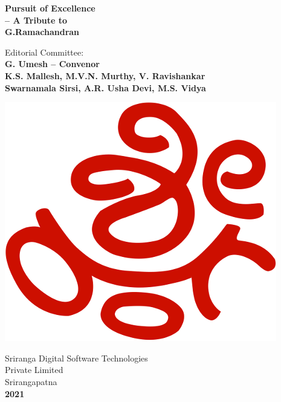 \thispagestyle{empty}
\begin{center}
{\fontsize{20}{22} \selectfont\sf \textbf{Pursuit of Excellence\\ – A Tribute to\\[8pt]  G.Ramachandran}}
\vfill


{\large Editorial Committee:}\\[4pt]
{\fontsize{12}{14}\selectfont\bfseries 
G. Umesh – Convenor\\[8pt]
K.S. Mallesh, M.V.N. Murthy, V. Ravishankar\\[8pt]
Swarnamala Sirsi, A.R. Usha Devi, M.S. Vidya
}
\vfill

\includegraphics[scale=0.4]{src/images/publisher.png}
\smallskip

{\fontsize{16}{18}\selectfont Sriranga Digital Software Technologies\\[4pt] Private Limited}\\[2pt]
{\fontsize{16}{18}\selectfont Srirangapatna\\[5pt]
{\bf 2021}}


\end{center}






